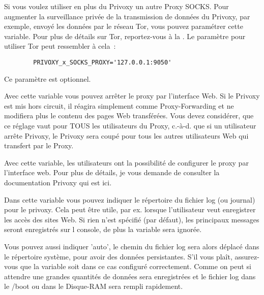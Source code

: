 \begin{description}

        {Si vous voulez utiliser en plus du Privoxy un autre Proxy SOCKS. Pour
        augmenter la surveillance privée de la transmission de données du Privoxy,
        par exemple, envoyé les données par le réseau Tor, vous pouvez paramétrer
        cette variable. Pour plus de détails sur Tor, reportez-vous à la
        . Le paramètre pour utiliser Tor peut
        ressembler à cela~:

\begin{example}
\begin{verbatim}
        PRIVOXY_x_SOCKS_PROXY='127.0.0.1:9050'
\end{verbatim}
\end{example}
        Ce paramètre est optionnel.}


        {Avec cette variable vous pouvez arrêter le proxy par l'interface Web.
        Si le Privoxy est mis hors circuit, il réagira simplement comme
        Proxy-Forwarding et ne modifiera plus le contenu des pages Web transférées.
        Vous devez considérer, que ce réglage vaut pour TOUS les utilisateurs du
        Proxy, c.-à-d. que si un utilisateur arrête Privoxy, le Privoxy sera coupé
        pour tous les autres utilisateurs Web qui transfert par le Proxy.}


        {Avec cette variable, les utilisateurs ont la possibilité de configurer
        le proxy par l'interface web. Pour plus de détails, je vous demande
        de consulter la documentation Privoxy qui est ici.}


        {Dans cette variable vous pouvez indiquer le répertoire du fichier log
        (ou journal) pour le privoxy. Cela peut être utile, par ex. lorsque
        l'utilisateur veut enregistrer les accès des sites Web. Si rien n'est
        spécifié (par défaut), les principaux messages seront enregistrés sur l
        console, de plus la variable  sera ignorée.}

        Vous pouvez aussi indiquer 'auto', le chemin du fichier log sera alors
        déplacé dans le répertoire système, pour avoir des données persistantes.
        S'il vous plaît, assurez-vous que la variable  soit dans
        ce cas configuré correctement. Comme on peut si attendre une grandes
        quantités de données sera enregistrées et le fichier log dans le /boot
        ou dans le Disque-RAM sera rempli rapidement.


\end{description}
